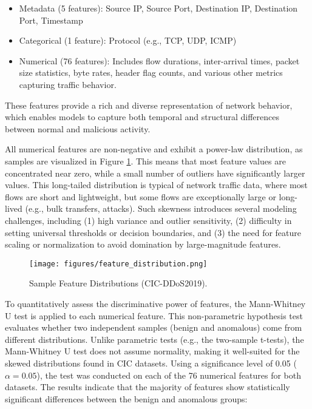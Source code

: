 \begin{itemize}
    \item Metadata (5 features): Source IP, Source Port, Destination IP, Destination Port, Timestamp
    \item Categorical (1 feature): Protocol (e.g., TCP, UDP, ICMP)
    \item Numerical (76 features): Includes flow durations, inter-arrival times, packet size statistics, byte rates, header flag counts, and various other metrics capturing traffic behavior.
\end{itemize}

These features provide a rich and diverse representation of network behavior, which enables models to capture both temporal and structural differences between normal and malicious activity.

All numerical features are non-negative and exhibit a power-law distribution, as samples are visualized in Figure \ref{fig:feature_distribution}. This means that most feature values are concentrated near zero, while a small number of outliers have significantly larger values. This long-tailed distribution is typical of network traffic data, where most flows are short and lightweight, but some flows are exceptionally large or long-lived (e.g., bulk transfers, attacks). Such skewness introduces several modeling challenges, including (1) high variance and outlier sensitivity, (2) difficulty in setting universal thresholds or decision boundaries, and (3) the need for feature scaling or normalization to avoid domination by large-magnitude features.

\begin{figure}[h]
    \centering
    \texttt{[image: figures/feature\_distribution.png]}
    \caption{Sample Feature Distributions (CIC-DDoS2019).}
    \label{fig:feature_distribution}
\end{figure}

To quantitatively assess the discriminative power of features, the Mann-Whitney U test is applied to each numerical feature. This non-parametric hypothesis test evaluates whether two independent samples (benign and anomalous) come from different distributions. Unlike parametric tests (e.g., the two-sample t-tests), the Mann-Whitney U test does not assume normality, making it well-suited for the skewed distributions found in CIC datasets. Using a significance level of 0.05 ($\alpha = 0.05$), the test was conducted on each of the 76 numerical features for both datasets. The results indicate that the majority of features show statistically significant differences between the benign and anomalous groups:

